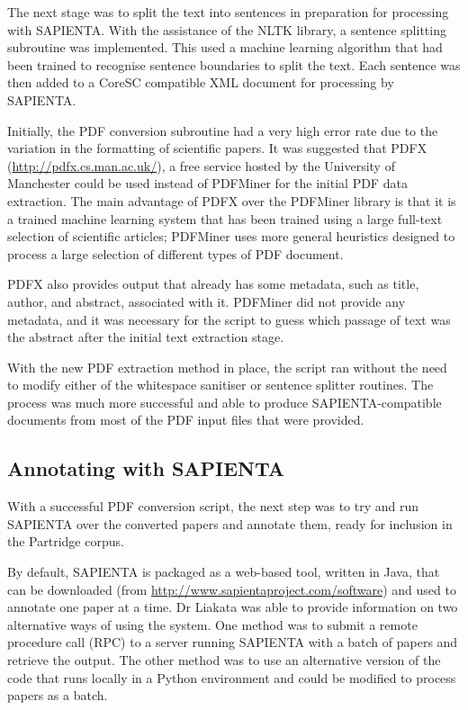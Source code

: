 The next stage was to split the text into sentences in preparation for
processing with SAPIENTA. With the assistance of the NLTK library, a sentence
splitting subroutine was implemented. This used a machine learning algorithm
that had been trained to recognise sentence boundaries to split the text. Each
sentence was then added to a CoreSC compatible XML document for processing by
SAPIENTA.

Initially, the PDF conversion subroutine had a very high error rate due to the
variation in the formatting of scientific papers. It was suggested that PDFX
(\url{http://pdfx.cs.man.ac.uk/}), a free service hosted by the University of
Manchester could be used instead of PDFMiner for the initial PDF data
extraction. The main advantage of PDFX over the PDFMiner library is that it is a
trained machine learning system that has been trained using a large full-text
selection of scientific articles; PDFMiner uses more general heuristics
designed to process a large selection of different types of PDF document.

PDFX also provides output that already has some metadata, such as title,
author, and abstract, associated with it. PDFMiner did not provide any
metadata, and it was necessary for the script to guess which passage of text
was the abstract after the initial text extraction stage.

With the new PDF extraction method in place, the script ran without the need
to modify either of the whitespace sanitiser or sentence splitter routines. The
process was much more successful and able to produce SAPIENTA-compatible
documents from most of the PDF input files that were provided.

\subsection{Annotating with SAPIENTA}
\label{sec:sapienta_implementation}

With a successful PDF conversion script, the next step was to try and run
SAPIENTA over the converted papers and annotate them, ready for inclusion in
the Partridge corpus.

By default, SAPIENTA is packaged as a web-based tool, written in Java, that
can be downloaded (from \url{http://www.sapientaproject.com/software}) and used
to annotate one paper at a time. Dr Liakata was able to provide information on
two alternative ways of using the system. One method was to submit a remote
procedure call (RPC) to a server running SAPIENTA with a batch of papers and
retrieve the output. The other method was to use an alternative version of the
code that runs locally in a Python environment and could be modified to process
papers as a batch.


